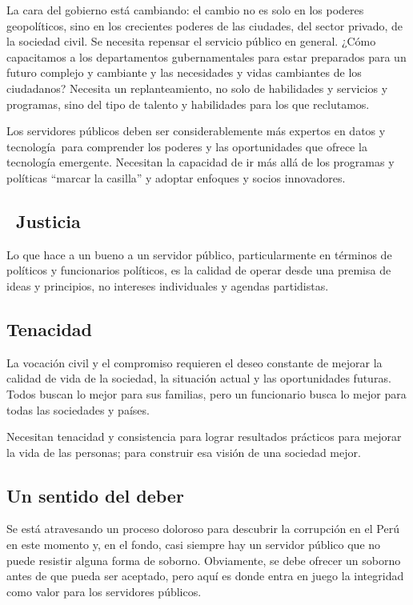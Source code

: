 \documentclass[
  jou,
  floatsintext,
  longtable,
  a4paper,
  nolmodern,
  notxfonts,
  notimes,
  12pt,
  colorlinks=true,linkcolor=blue,citecolor=blue,urlcolor=blue]{apa7}
\begin{document}
La cara del gobierno está cambiando: el cambio no es solo en los poderes
geopolíticos, sino en los crecientes poderes de las ciudades, del sector
privado, de la sociedad civil. Se necesita repensar el servicio público
en general. ¿Cómo capacitamos a los departamentos gubernamentales para
estar preparados para un futuro complejo y cambiante y las necesidades y
vidas cambiantes de los ciudadanos? Necesita un replanteamiento, no solo
de habilidades y servicios y programas, sino del tipo de talento y
habilidades para los que reclutamos.

Los servidores públicos deben ser considerablemente más expertos en
datos y tecnología~para comprender los poderes y las oportunidades que
ofrece la tecnología emergente. Necesitan la capacidad de ir más allá de
los programas y políticas ``marcar la casilla'' y adoptar enfoques y
socios innovadores.

\subsection{~Justicia}\label{justicia}

Lo que hace a un bueno a un servidor público, particularmente en
términos de políticos y funcionarios políticos, es la calidad de operar
desde una premisa de ideas y principios, no intereses individuales y
agendas partidistas.

\subsection{Tenacidad}\label{tenacidad}

La vocación civil y el compromiso requieren el deseo constante de
mejorar la calidad de vida de la sociedad, la situación actual y las
oportunidades futuras. Todos buscan lo mejor para sus familias, pero un
funcionario busca lo mejor para todas las sociedades y países.

Necesitan tenacidad y consistencia para lograr resultados prácticos para
mejorar la vida de las personas; para construir esa visión de una
sociedad mejor.

\subsection{Un sentido del deber}\label{un-sentido-del-deber}

Se está atravesando un proceso doloroso para descubrir la corrupción en
el Perú en este momento y, en el fondo, casi siempre hay un servidor
público que no puede resistir alguna forma de soborno. Obviamente, se
debe ofrecer un soborno antes de que pueda ser aceptado, pero aquí es
donde entra en juego la integridad como valor para los servidores
públicos.
\end{document}
